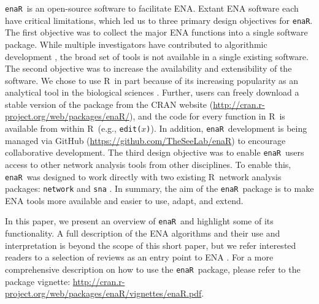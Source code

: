 \documentclass[11pt]{article}
\newcommand{\R}{R}
\newcommand{\enaR}{\texttt{enaR}}
\begin{document}
\begin{spacing}{2}
\enaR\ is an open-source software to facilitate ENA.  Extant ENA
software \citep{ulanowicz91, kazanci07, allesina04_wand,
  christensen04, fath06} each have critical limitations, which led us
to three primary design objectives for \enaR .
The first objective was to collect the major ENA functions into a
single software package.  While multiple investigators have
contributed to algorithmic development \citep[e.g.,][]{finn76,
  ulanowicz86, ulanowicz91, fath99_review, allesina03}, the broad set
of tools is not available in a single existing software.  The second
objective was to increase the availability and extensibility of the
software. We chose to use \R\ in part because of its
increasing popularity as an analytical tool in the biological sciences
\citep[e.g.,][]{dixon2003vegan, metcalf2012, revell2012phytools}.
Further, users can freely download a stable version of the package
from the CRAN website
(\url{http://cran.r-project.org/web/packages/enaR/}), and the code for
every function in \R\ is available from within \R\ (e.g.,
\texttt{edit($x$)}).  In addition, \enaR\ development is being managed
via GitHub (\url{https://github.com/TheSeeLab/enaR}) to encourage
collaborative development.  The third design objective was to enable
\enaR\ users access to other network analysis tools from other
disciplines.  To enable this, \enaR\ was designed to work directly
with two existing \R\ network analysis packages:  \texttt{network}
\citep{butts08_network} and \texttt{sna} \citep{butts08_social}.  In
summary, the aim of the \enaR\ package is to make ENA tools more
available and easier to use, adapt, and extend.

In this paper, we present an overview of \enaR\ and highlight some of
its functionality.  A full description of the ENA algorithms and their
use and interpretation is beyond the scope of this short paper, but we
refer interested readers to a selection of reviews as an entry point
to ENA \citep{fath99_review, ulanowicz97, fath06, schramski11,
  jorgensen07_newecology}.  For a more comprehensive description on
how to use the \enaR\ package, please refer to the package vignette:
\url{http://cran.r-project.org/web/packages/enaR/vignettes/enaR.pdf}.


\end{spacing}
\end{document}
